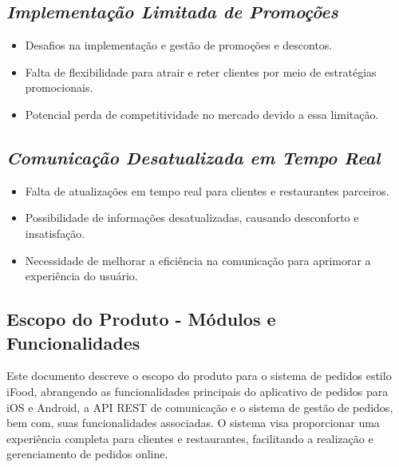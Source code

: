 \subsection*{\textit{Implementação Limitada de Promoções}}

\begin{itemize}
    \item Desafios na implementação e gestão de promoções e descontos.
    \item Falta de flexibilidade para atrair e reter clientes por meio de estratégias promocionais.
    \item Potencial perda de competitividade no mercado devido a essa limitação.
\end{itemize}

\subsection*{\textit{Comunicação Desatualizada em Tempo Real}}

\begin{itemize}
    \item Falta de atualizações em tempo real para clientes e restaurantes parceiros.
    \item Possibilidade de informações desatualizadas, causando desconforto e insatisfação.
    \item Necessidade de melhorar a eficiência na comunicação para aprimorar a experiência do usuário.
\end{itemize}

\subsection{Escopo do Produto - Módulos e Funcionalidades}


Este documento descreve o escopo do produto para o sistema de pedidos estilo iFood, abrangendo as funcionalidades principais do aplicativo de pedidos para iOS e Android, a API REST de comunicação e o sistema de gestão de pedidos, bem com, suas funcionalidades associadas. O sistema visa proporcionar uma experiência completa para clientes e restaurantes, facilitando a realização e gerenciamento de pedidos online.

